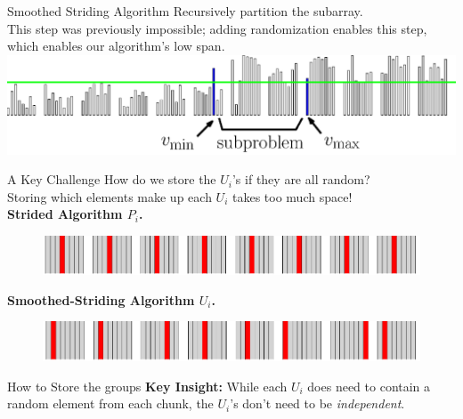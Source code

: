 \documentclass[table,serif,mathserif,final]{beamer}
\theoremstyle{remark}
\begin{document}
\begin{frame}{}
\begin{columns}[t]
\begin{column}{0.5\linewidth}
\begin{block}{\Huge Smoothed Striding Algorithm}
	Recursively partition the subarray.\\
  {\color{blue}This step was previously impossible; adding randomization enables this step, which enables our algorithm's low span. }
	\includegraphics[width=\linewidth]{imgs/smoothedStridingAlgSim/sim45.eps}
\end{block}

\begin{block}{\Huge A Key Challenge}
  \Huge
How do we store the $U_i$'s if they are all random?	\\
\vspace{0.5cm}
Storing which elements make up each $U_i$ takes too much space!\\

\vspace{0.5cm}
\textbf{Strided Algorithm $P_i$.}
\begin{figure}
	\includegraphics[width=\linewidth]{imgs/stridedAlgHighlighted.png}
\end{figure}
\textbf{Smoothed-Striding Algorithm $U_i$.}
\begin{figure}
	\includegraphics[width=\linewidth]{imgs/smoothedStridingAlgHighlighted.png}
\end{figure}
\end{block}

\begin{block}{How to Store the groups}
  \Huge
	\textbf{Key Insight:} While each $U_i$ does need to contain a random element from each chunk, the $U_i$'s don't need to be \emph{independent}.


\end{block}
\end{column}
\end{columns}
\end{frame}
\end{document}
